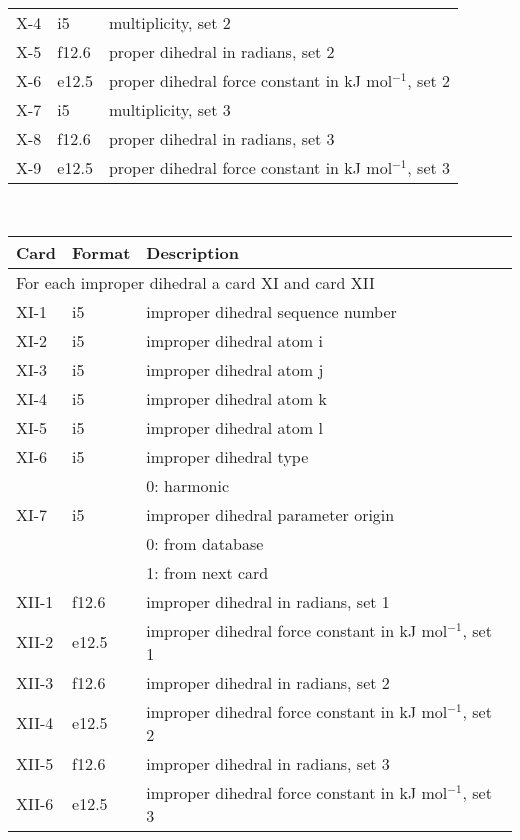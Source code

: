 \begin{center}
\begin{tabular}{lll}
X-4 & i5     & multiplicity, set 2\\
X-5 & f12.6  & proper dihedral in radians, set 2\\
X-6 & e12.5  & proper dihedral force constant in kJ mol$^{-1}$, set 2 \\
X-7 & i5     & multiplicity, set 3\\
X-8 & f12.6  & proper dihedral in radians, set 3\\
X-9 & e12.5  & proper dihedral force constant in kJ mol$^{-1}$, set 3 \\
\hline
\end{tabular}\\
\begin{tabular}{lll}
\hline\hline
Card & Format & Description \\ \hline
\multicolumn{3}{l}{For each improper dihedral a card XI and card XII} \\
XI-1  & i5     & improper dihedral sequence number \\
XI-2  & i5     & improper dihedral atom i \\
XI-3  & i5     & improper dihedral atom j \\
XI-4  & i5     & improper dihedral atom k \\
XI-5  & i5     & improper dihedral atom l \\
XI-6  & i5     & improper dihedral type \\
      &        & 0: harmonic\\
XI-7  & i5     & improper dihedral parameter origin\\
      &        & 0: from database \\
      &        & 1: from next card\\
XII-1 & f12.6  & improper dihedral in radians, set 1\\
XII-2 & e12.5  & improper dihedral force constant in kJ mol$^{-1}$, set 1 \\
XII-3 & f12.6  & improper dihedral in radians, set 2\\
XII-4 & e12.5  & improper dihedral force constant in kJ mol$^{-1}$, set 2 \\
XII-5 & f12.6  & improper dihedral in radians, set 3\\
XII-6 & e12.5  & improper dihedral force constant in kJ mol$^{-1}$, set 3 \\
\hline\hline
\end{tabular}
\end{center}
